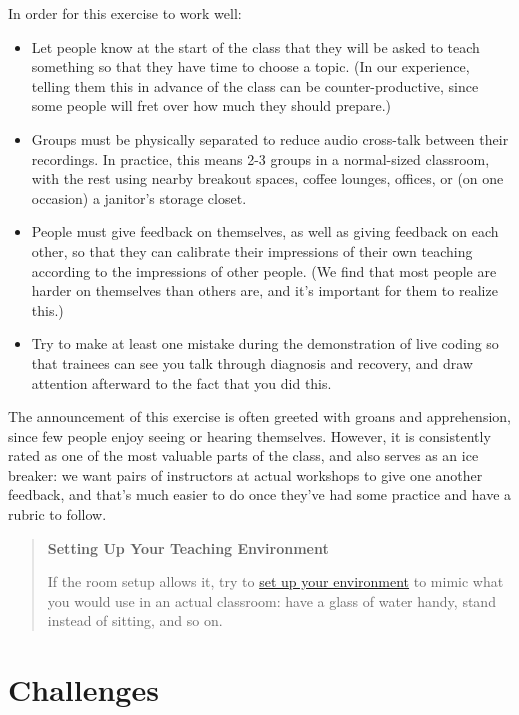 \documentclass[10pt,statementpaper]{memoir}
\begin{document}
In order for this exercise to work well:

\begin{itemize}
\item
  Let people know at the start of the class that they will be asked to
  teach something so that they have time to choose a topic. (In our
  experience, telling them this in advance of the class can be
  counter-productive, since some people will fret over how much they
  should prepare.)
\item
  Groups must be physically separated to reduce audio cross-talk between
  their recordings. In practice, this means 2-3 groups in a normal-sized
  classroom, with the rest using nearby breakout spaces, coffee lounges,
  offices, or (on one occasion) a janitor's storage closet.
\item
  People must give feedback on themselves, as well as giving feedback on
  each other, so that they can calibrate their impressions of their own
  teaching according to the impressions of other people. (We find that
  most people are harder on themselves than others are, and it's
  important for them to realize this.)
\item
  Try to make at least one mistake during the demonstration of live
  coding so that trainees can see you talk through diagnosis and
  recovery, and draw attention afterward to the fact that you did this.
\end{itemize}

The announcement of this exercise is often greeted with groans and
apprehension, since few people enjoy seeing or hearing themselves.
However, it is consistently rated as one of the most valuable parts of
the class, and also serves as an ice breaker: we want pairs of
instructors at actual workshops to give one another feedback, and that's
much easier to do once they've had some practice and have a rubric to
follow.

\begin{quote}
\textbf{Setting Up Your Teaching Environment}

If the room setup allows it, try to
\href{practices.html\#setting-up-your-own-environment}{set up your
environment} to mimic what you would use in an actual classroom: have a
glass of water handy, stand instead of sitting, and so on.
\end{quote}

\section{Challenges}\label{challenges-2}
\end{document}
